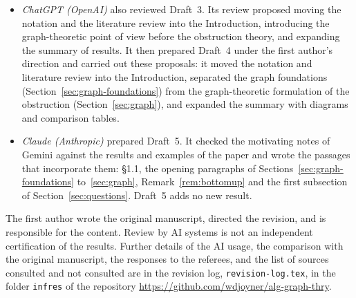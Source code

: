 \documentclass[12pt,letterpaper]{article}
\numberwithin{equation}{section}
\theoremstyle{plain}
\theoremstyle{definition}
\begin{document}
\begin{itemize}[itemsep=2pt]
material proposed by ChatGPT, and added
Propositions~\ref{prop:fiber-general} and~\ref{prop:lifts},
Examples~\ref{ex:pauli}, \ref{ex:clifford}, \ref{ex:runH}
and~\ref{ex:twocycle}, and Remark~\ref{rem:graph-nonab}. For Draft~3 it
brought the paper into conformity with the first author's style guide for
mathematical papers, and added the literature review, the summary of
results and the orienting paragraphs.
\item \emph{ChatGPT (OpenAI)} also reviewed Draft~3. Its review proposed
moving the notation and the literature review into the Introduction,
introducing the graph-theoretic point of view before the obstruction
theory, and expanding the summary of results. It then prepared Draft~4
under the first author's direction and carried out these proposals: it
moved the notation and literature review into the Introduction,
separated the graph foundations
(Section~\ref{sec:graph-foundations}) from the graph-theoretic
formulation of the obstruction (Section~\ref{sec:graph}), and expanded
the summary with diagrams and comparison tables.
\item \emph{Claude (Anthropic)} prepared Draft~5. It checked the
motivating notes of Gemini against the results and examples of the
paper and wrote the passages that incorporate them: \S1.1, the opening
paragraphs of Sections~\ref{sec:graph-foundations} to~\ref{sec:graph},
Remark~\ref{rem:bottomup} and the first subsection of
Section~\ref{sec:questions}. Draft~5 adds no new result.
\end{itemize}
The first author wrote the original manuscript, directed the revision,
and is responsible for the content. Review by AI systems is not an
independent certification of the results. Further details of the AI
usage, the comparison with the original manuscript, the responses to the
referees, and the list of sources consulted and not consulted are in the
revision log, \texttt{revision-log.tex}, in the folder \texttt{infres} of
the repository \url{https://github.com/wdjoyner/alg-graph-thry}.
\end{document}
